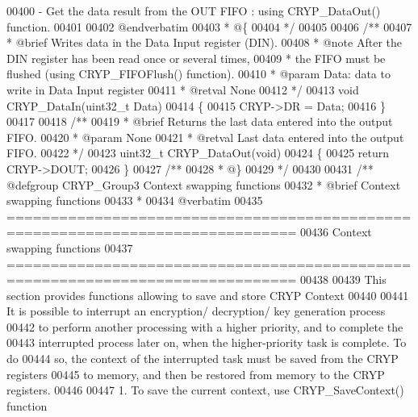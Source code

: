 \begin{DoxyCode}
00400 \textcolor{comment}{  - Get the data result from the OUT FIFO : using CRYP\_DataOut() function.}
00401 \textcolor{comment}{}
00402 \textcolor{comment}{@endverbatim}
00403 \textcolor{comment}{  * @\{}
00404 \textcolor{comment}{  */}
00405 
00406 \textcolor{comment}{/**}
00407 \textcolor{comment}{  * @brief  Writes data in the Data Input register (DIN).}
00408 \textcolor{comment}{  * @note   After the DIN register has been read once or several times, }
00409 \textcolor{comment}{  *         the FIFO must be flushed (using CRYP\_FIFOFlush() function).  }
00410 \textcolor{comment}{  * @param  Data: data to write in Data Input register}
00411 \textcolor{comment}{  * @retval None}
00412 \textcolor{comment}{  */}
00413 \textcolor{keywordtype}{void} CRYP_DataIn(uint32\_t Data)
00414 \{
00415   CRYP->DR = Data;
00416 \}
00417 
00418 \textcolor{comment}{/**}
00419 \textcolor{comment}{  * @brief  Returns the last data entered into the output FIFO.}
00420 \textcolor{comment}{  * @param  None}
00421 \textcolor{comment}{  * @retval Last data entered into the output FIFO.}
00422 \textcolor{comment}{  */}
00423 uint32\_t CRYP_DataOut(\textcolor{keywordtype}{void})
00424 \{
00425   \textcolor{keywordflow}{return} CRYP->DOUT;
00426 \}
00427 \textcolor{comment}{/**}
00428 \textcolor{comment}{  * @\}}
00429 \textcolor{comment}{  */}
00430 
00431 \textcolor{comment}{/** @defgroup CRYP\_Group3 Context swapping functions}
00432 \textcolor{comment}{ *  @brief   Context swapping functions}
00433 \textcolor{comment}{ *}
00434 \textcolor{comment}{@verbatim   }
00435 \textcolor{comment}{ ===============================================================================}
00436 \textcolor{comment}{                             Context swapping functions}
00437 \textcolor{comment}{ ===============================================================================  }
00438 \textcolor{comment}{}
00439 \textcolor{comment}{  This section provides functions allowing to save and store CRYP Context}
00440 \textcolor{comment}{}
00441 \textcolor{comment}{  It is possible to interrupt an encryption/ decryption/ key generation process }
00442 \textcolor{comment}{  to perform another processing with a higher priority, and to complete the }
00443 \textcolor{comment}{  interrupted process later on, when the higher-priority task is complete. To do }
00444 \textcolor{comment}{  so, the context of the interrupted task must be saved from the CRYP registers }
00445 \textcolor{comment}{  to memory, and then be restored from memory to the CRYP registers.}
00446 \textcolor{comment}{   }
00447 \textcolor{comment}{  1. To save the current context, use CRYP\_SaveContext() function}

\end{DoxyCode}
